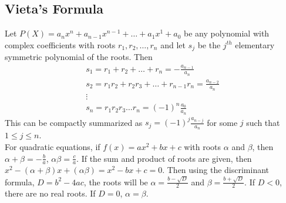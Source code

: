 \documentclass[12pt]{extarticle}
\begin{document}
\subsection*{Vieta's Formula}
Let $P(X)=a_{n}x^{n}+a_{n-1}x^{n-1}+\dots+a_{1}x^{1}+a_{0}$ be any polynomial with complex coefficients with roots $r_{1},r_{2},\dots,r_{n}$ and let $s_{j}$ be the $j^{th}$ elementary symmetric polynomial of the roots. Then 
\begin{gather*}
s_{1}=r_{1}+r_{2}+\dots+r_{n}=-\frac{a_{n-1}}{a_{n}}\\
s_{2}=r_{1}r_{2}+r_{2}r_{3}+\dots+r_{n-1}r_{n}=\frac{a_{n-2}}{a_{n}}\\
\vdots \\
s_{n}=r_{1}r_{2}r_{3}\dots r_{n}=(-1)^{n}\frac{a_{0}}{a_{n}}
\end{gather*}
This can be compactly summarized as $s_{j}=(-1)^{j}\frac{a_{n-j}}{a_{n}}$ for some $j$ such that  $1\leq j\leq n$.\\
For quadratic equations, if $f(x)=ax^{2}+bx+c$ with roots $\alpha$ and $\beta$, then $\alpha+\beta=-\frac{b}{a}$, $\alpha\beta=\frac{c}{a}$. If the sum and product of roots are given, then $x^{2}-(\alpha+\beta)x+(\alpha\beta)=x^{2}-bx+c=0$. Then using the discriminant formula,  $D=b^{2}-4ac$, the roots will be $\alpha=\frac{b-\sqrt{D}}{2}$ and $\beta=\frac{b+\sqrt{D}}{2}$. If $D<0$, there are no real roots. If $D=0$, $\alpha=\beta$.
\end{document}
